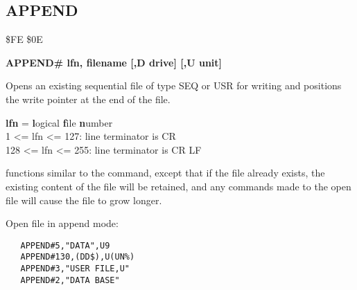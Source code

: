 \subsection{APPEND}
\begin{description}[leftmargin=2cm,style=nextline]
\item [Token:] \$FE \$0E
\item [Format:]
  {\bf APPEND\# lfn, filename [,D drive] [,U unit] }
\item [Usage:]
   Opens an existing sequential file of type
   SEQ or USR for writing and positions the write pointer
   at the end of the file.

   {\bf lfn} = {\bf l}ogical {\bf f}ile {\bf n}umber \\
   1 <= lfn <= 127: line terminator is CR \\
   128 <= lfn <= 255: line terminator is CR LF

   \filenamedefinition

   \drivedefinition

   \unitdefinition

\item [Remarks:]
    functions similar to the 
   command, except that if the file already
   exists, the existing content of the file will be retained, and any
    commands made to the
   open file will cause the file to grow longer.

\item [Example:] Open file in append mode:

\begin{tcolorbox}[colback=black,coltext=white]
\verbatimfont{\codefont}
\begin{verbatim}
   APPEND#5,"DATA",U9
   APPEND#130,(DD$),U(UN%
   APPEND#3,"USER FILE,U"
   APPEND#2,"DATA BASE"
\end{verbatim}
\end{tcolorbox}
\end{description}


\newpage
